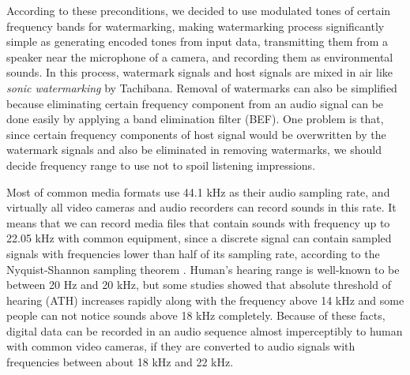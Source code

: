 According to these preconditions, we decided to use modulated tones of certain frequency bands for watermarking, making watermarking process significantly simple as generating encoded tones from input data, transmitting them from a speaker near the microphone of a camera, and recording them as environmental sounds.
In this process, watermark signals and host signals are mixed in air like {\it sonic watermarking} by Tachibana. \cite{tachibana2003audio}
Removal of watermarks can also be simplified because eliminating certain frequency component from an audio signal can be done easily by applying a band elimination filter (BEF).
One problem is that, since certain frequency components of host signal would be overwritten by the watermark signals and also be eliminated in removing watermarks, we should decide frequency range to use not to spoil listening impressions.

Most of common media formats use 44.1 kHz as their audio sampling rate, and virtually all video cameras and audio recorders can record sounds in this rate. It means that we can record media files that contain sounds with frequency up to 22.05 kHz with common equipment, since a discrete signal can contain sampled signals with frequencies lower than half of its sampling rate, according to the Nyquist-Shannon sampling theorem \cite{shannon1949communication}.
Human's hearing range is well-known to be between 20 Hz and 20 kHz, but some studies showed that absolute threshold of hearing (ATH) increases rapidly along with the frequency above 14 kHz and some people can not notice sounds above 18 kHz completely. \cite{:/content/asa/journal/jasa/86/4/10.1121/1.398698, ashihara2006hearing}
Because of these facts, digital data can be recorded in an audio sequence almost imperceptibly to human with common video cameras, if they are converted to audio signals with frequencies between about 18 kHz and 22 kHz.

